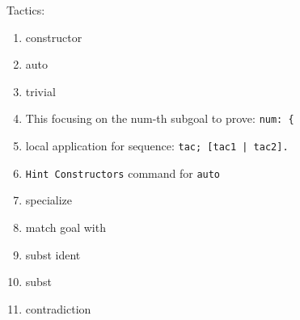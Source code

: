 \documentclass[12pt]{article}
\begin{document}
Tactics:
\begin{enumerate}
\item constructor
\item auto
\item trivial
\item This focusing on the num-th subgoal to prove: {\tt num: \{}
\item local application for sequence: {\tt tac; [tac1 | tac2].}
\item {\tt Hint Constructors} command for {\tt auto}
\item specialize
\item match goal with
\item subst ident
\item subst
\item contradiction
\end{enumerate}
\end{document}
